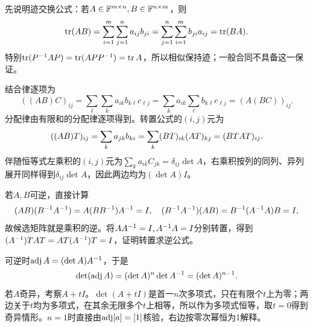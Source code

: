 \label{der:2-1}
先说明迹交换公式：若$A\in\mathbb{F}^{m\times n},B\in\mathbb{F}^{n\times m}$，则
\[\operatorname{tr}(AB)=\sum_{i=1}^m\sum_{j=1}^n a_{ij}b_{ji}=\sum_{j=1}^n\sum_{i=1}^m b_{ji}a_{ij}=\operatorname{tr}(BA).\]
特别$\operatorname{tr}(P^{-1} AP)=\operatorname{tr}(APP^{-1})=\operatorname{tr} A$，所以相似保持迹；一般合同不具备这一保证。

结合律逐项为
\[((AB)C)_{ij}=\sum_\ell\sum_k a_{ik}b_{k\ell}c_{\ell j}=\sum_k a_{ik}\sum_\ell b_{k\ell}c_{\ell j}=(A(BC))_{ij}.\]
分配律由有限和的分配律逐项得到。转置公式的$(i,j)$元为
\[((AB)T)_{ij}=\sum_k a_{jk}b_{ki}=\sum_k(BT)_{ik}(AT)_{kj}=(BT AT)_{ij}.\]
伴随恒等式左乘积的$(i,j)$元为$\sum_k a_{ik}C_{jk}=\delta_{ij}\det A$，右乘积按列的同列、异列展开同样得到$\delta_{ij}\det A$，因此两边均为$(\det A)I$。

若$A,B$可逆，直接计算
\[(AB)(B^{-1} A^{-1})=A(BB^{-1})A^{-1}=I,\quad
(B^{-1} A^{-1})(AB)=B^{-1}(A^{-1} A)B=I,\]
故候选矩阵就是乘积的逆。将$AA^{-1}=I,A^{-1} A=I$分别转置，得到$(A^{-1})T AT=AT(A^{-1})T=I$，证明转置求逆公式。

可逆时$\operatorname{adj} A=(\det A)A^{-1}$，于是
\[\det(\operatorname{adj} A)=(\det A)^n\det A^{-1}=(\det A)^{n-1}.\]
若$A$奇异，考察$A+tI$。$\det(A+tI)$是首一$n$次多项式，只在有限个$t$上为零；两边关于$t$均为多项式，在其余无限多个$t$上相等，所以作为多项式恒等，取$t=0$得到奇异情形。$n=1$时直接由$\operatorname{adj}[a]=[1]$核验，右边按零次幂恒为1解释。
